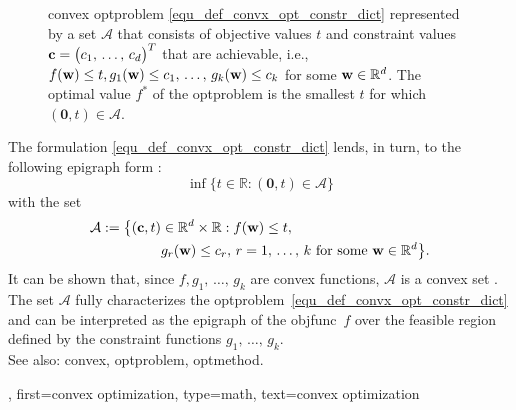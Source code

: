 {{\begin{figure}[H]
  		\caption{\Gls{convex} \gls{optproblem} \eqref{equ_def_convx_opt_constr_dict} represented 
  			by a set $\mathcal{A}$ that consists of objective values $t$ and constraint values 
  			${\bf c}=\big(c_{1},\,\ldots,\,c_{d}\big)^{T}$ that are achievable, i.e., 
  			$f({\bf w}) \leq t, g_{1}({\bf w})\leq c_{1},\,\ldots, \,g_{k}({\bf w}) \leq c_{k}$ 
  			for some ${\bf w} \in \mathbb{R}^{d}$. The optimal value $f^{\ast}$ of the 
  			\gls{optproblem} is the smallest $t$ for which $(\mathbf{0},t) \in \mathcal{A}$. }
		\end{figure}
		The formulation \eqref{equ_def_convx_opt_constr_dict} lends, in turn, to the 
		following \gls{epigraph} form \cite[Sec. 5.3]{BoydConvexBook}:
		$$\inf \big\{ t \in \mathbb{R} : (\mathbf{0}, t) \in \mathcal{A} \big\}$$ 
		with the set
		\begin{align} 
			\mathcal{A} := 
    			\big\{ ({\bf c},t) & \in \mathbb{R}^{d} \times \mathbb{R} : 
    			f({\bf w}) \leq t, \, \nonumber \\ 
   			&  g_{r}({\bf w}) \leq c_{r}, \,
    			r = 1,\,\ldots,\,k 
    			\text{ for some } {\bf w} \in \mathbb{R}^{d} \big\}. \nonumber
		\end{align}
		It can be shown that, since $f,g_{1},\,\ldots,\,g_{k}$ are \gls{convex} \glspl{function}, 
    		$\mathcal{A}$ is a \gls{convex} set \cite[Ch. 2]{BoydConvexBook}.
		The set $\mathcal{A}$ fully characterizes the \gls{optproblem}~\eqref{equ_def_convx_opt_constr_dict} 
		and can be interpreted as the \gls{epigraph} of the \gls{objfunc}~$f$ over the 
		feasible region defined by the constraint \glspl{function} $g_1,\,\ldots,\,g_k$.
		\\ 
    		See also: \gls{convex}, \gls{optproblem}, \gls{optmethod}. },
	first={convex optimization},
	type=math,
  	text={convex optimization}
}

